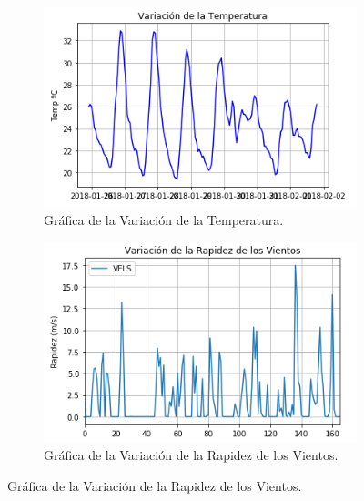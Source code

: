 \documentclass[12pt]{article}
\begin{document}
\begin{figure}[h!]
\begin{subfigure}{.5\textwidth}
  \centering
  \includegraphics[width=.8\linewidth]{EjGraf1.png}
  \caption{Gráfica de la Variación de la Temperatura.}
  \label{fig:sfig1}
\end{subfigure}%
\begin{subfigure}{.6\textwidth}
  \centering
  \includegraphics[width=.8\linewidth]{EjGraf3.png}
  \caption{Gráfica de la Variación de la Rapidez de los Vientos.}
  \label{fig:sfig2}
\end{subfigure}
\end{figure}

\newpage
\end{document}
